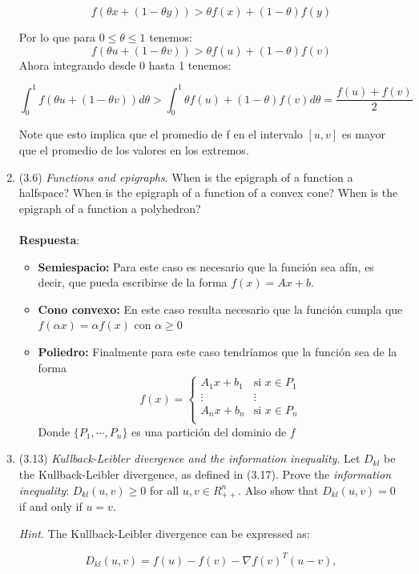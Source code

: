 \documentclass[12pt, oneside]{article}%
\begin{document}
\begin{enumerate}
$$f(\theta x + (1-\theta y)) > \theta f(x) + (1- \theta)f(y)$$

Por lo que para $0 \leq \theta \leq 1$ tenemos:
$$f(\theta u + (1-\theta v)) > \theta f(u) + (1- \theta)f(v)$$
Ahora integrando desde 0 hasta 1 tenemos: 

$$\int_0^1 f(\theta u + (1-\theta v)) d\theta > \int_0^1  \theta f(u) + (1- \theta)f(v)d\theta = \frac{f(u) + f(v)}{2}$$

Note que esto implica que el promedio de f en el intervalo $[u,v]$ es mayor que el promedio de los valores en los extremos. 

\item (3.6) \textit{Functions and epigraphs}. When is the epigraph of a function a halfspace? When is the epigraph of a function of a convex cone? When is the epigraph of a function a polyhedron?\\ \\
\textbf{Respuesta}: \\
\begin{itemize}
    \item \textbf{Semiespacio:} Para este caso es necesario que la función sea afín, es decir, que pueda escribirse de la forma $f(x)=Ax+b$.
    \item \textbf{Cono convexo:} En este caso resulta necesario que la función cumpla que $f(\alpha x)=\alpha f(x)$ con $\alpha \geq 0$
    \item \textbf{Poliedro:} Finalmente para este caso tendríamos que la función sea de la forma
    $$f(x)=\begin{cases}
    A_1x+b_1 & \text{si } x\in P_1\\
    \vdots & \vdots\\
    A_nx+b_n & \text{si } x\in P_n\\
    \end{cases}
    $$
    Donde $\{P_1,\cdots,P_n\}$ es una partición del dominio de $f$\\
\end{itemize}
\item (3.13) \textit{Kullback-Leibler divergence and the information inequality}. Let $D_{kl}$ be the Kullback-Leibler divergence, as defined in (3.17). Prove the \textit{information inequality}: $D_{kl}(u,v) \geq 0$ for all $u,v \in R_{++}^n.$ Also show that $D_{kl}(u,v) = 0$ if and only if $u=v$.

\textit{Hint}. The Kullback-Leibler divergence can be expressed as:

$$ D_{kl}(u,v) = f(u) - f(v) - \nabla f(v)^T(u-v),$$


\end{enumerate}
\end{document}
